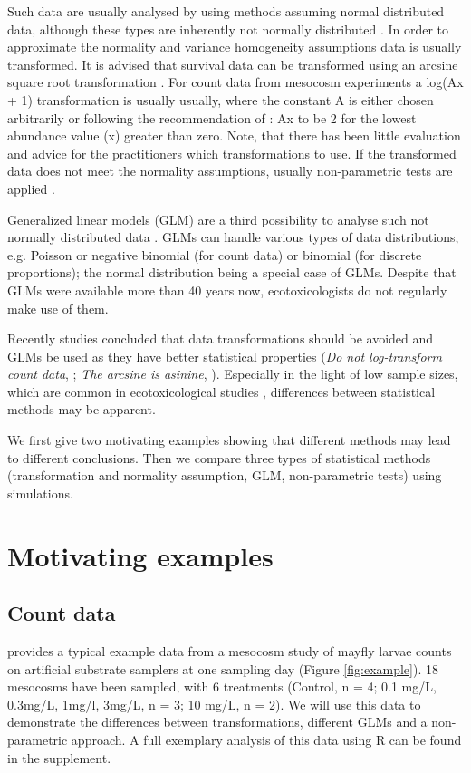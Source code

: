 \documentclass{scrartcl}
\begin{document}
Such data are usually analysed by using methods assuming normal distributed data, although these types are inherently not normally distributed \citep{wang_making_2011}. 
In order to approximate the normality and variance homogeneity assumptions data is usually transformed.
It is advised that survival data can be transformed using an arcsine square root transformation \citep{oecd_current_2006, newman_quantitative_2012}. 
For count data from mesocosm experiments a log(Ax + 1) transformation is usually usually, where the constant A is either chosen arbitrarily or following the recommendation of \citet{van_den_brink_impact_2000}: Ax to be 2 for the lowest abundance value (x) greater than zero. 
Note, that there has been little evaluation and advice for the practitioners which transformations to use.
If the transformed data does not meet the normality assumptions, usually non-parametric tests are applied \citep{wang_making_2011}.

Generalized linear models (GLM) are a third possibility to analyse such not normally distributed data \citep{nelder_generalized_1972}.
GLMs can handle various types of data distributions, e.g. Poisson or negative binomial (for count data) or binomial (for discrete proportions); the normal distribution being a special case of GLMs.
Despite that GLMs were available more than 40 years now, ecotoxicologists do not regularly make use of them.

Recently studies concluded that data transformations should be avoided and GLMs be used as they have better statistical properties (\emph{Do not log-transform count data}, \citep{ohara_not_2010}; \emph{The arcsine is asinine}, \citep{warton_arcsine_2011}).
Especially in the light of low sample sizes, which are common in ecotoxicological studies \citep{sanderson_pesticide_2002,szocs_analysing_2015}, differences between statistical methods may be apparent. 

We first give two motivating examples showing that different methods may lead to different conclusions. 
Then we compare three types of statistical methods (transformation and normality assumption, GLM, non-parametric tests) using simulations.


\newpage
\section{Motivating examples}
\subsection{Count data}
\citet{brock_minimum_2014} provides a typical example data from a mesocosm study of mayfly larvae counts on artificial substrate samplers at one sampling day (Figure \ref{fig:example}). 
18 mesocosms have been sampled, with 6 treatments (Control, n = 4; 0.1 mg/L, 0.3mg/L, 1mg/l, 3mg/L, n = 3; 10 mg/L, n = 2).
We will use this data to demonstrate the differences between transformations, different GLMs and a non-parametric approach.
A full exemplary analysis of this data using R \citep{r_core_team_r:_2014} can be found in the supplement.
\end{document}
